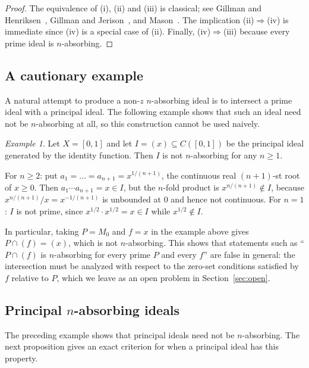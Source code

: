 \documentclass[11pt]{amsart}
\theoremstyle{definition}
\theoremstyle{remark}
\newtheorem{example}[theorem]{Example}
\begin{document}
\begin{proof}
The equivalence of (i), (ii) and (iii) is classical; see
Gillman and Henriksen~\cite{GillmanHenriksen},
Gillman and Jerison~\cite[4J]{GillmanJerison}, and
Mason~\cite[Theorem~1.2]{Mason}. The implication (ii)$\Rightarrow$(iv) is
immediate since (iv) is a special case of (ii). Finally,
(iv)$\Rightarrow$(iii) because every prime ideal is $n$-absorbing.
\end{proof}

\subsection{A cautionary example}

A natural attempt to produce a non-$z$ $n$-absorbing ideal is to
intersect a prime ideal with a principal ideal. The following example
shows that such an ideal need not be $n$-absorbing at all, so this
construction cannot be used naively.

\begin{example}
\label{ex:principal-not-absorbing}
Let $X=[0,1]$ and let $I=(x)\subseteq C([0,1])$ be the principal ideal
generated by the identity function. Then $I$ is not $n$-absorbing for
any $n\ge1$.

For $n\ge2$: put $a_1=\dots=a_{n+1}=x^{1/(n+1)}$, the continuous real
$(n+1)$-st root of $x\ge0$. Then $a_1\cdots a_{n+1}=x\in I$, but the
$n$-fold product is $x^{n/(n+1)}\notin I$, because
$x^{n/(n+1)}/x=x^{-1/(n+1)}$ is unbounded at $0$ and hence not
continuous. For $n=1$: $I$ is not prime, since $x^{1/2}\cdot x^{1/2}=x\in I$
while $x^{1/2}\notin I$.
\end{example}

In particular, taking $P=M_0$ and $f=x$ in the example above gives
$P\cap(f)=(x)$, which is not $n$-absorbing. This shows that statements
such as ``$P\cap(f)$ is $n$-absorbing for every prime $P$ and every $f$''
are false in general: the intersection must be analyzed with respect to
the zero-set conditions satisfied by $f$ relative to $P$, which we leave
as an open problem in Section~\ref{sec:open}.

\subsection{Principal \texorpdfstring{$n$}{n}-absorbing ideals}

The preceding example shows that principal ideals need not be
$n$-absorbing. The next proposition gives an exact criterion for when
a principal ideal has this property.
\end{document}
